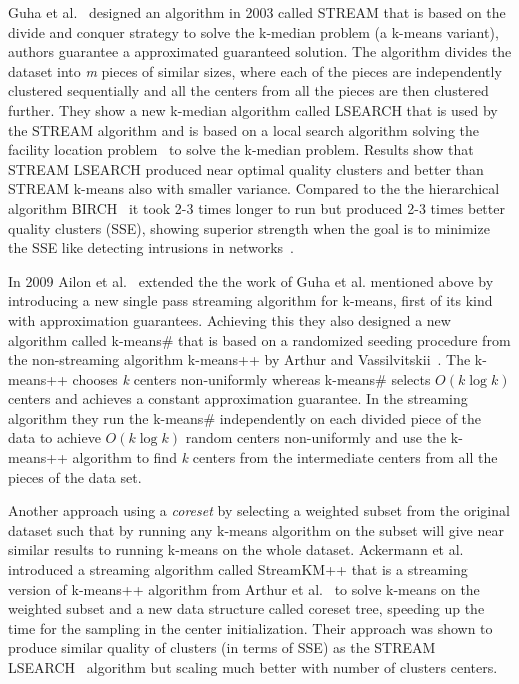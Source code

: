 Guha et al.~\citep{Guha:2003} designed an algorithm in 2003 called STREAM that is based on the divide and conquer strategy to solve the k-median problem (a k-means variant), authors guarantee a approximated guaranteed solution. The algorithm divides the dataset into \textit{m} pieces of similar sizes, where each of the pieces are independently clustered sequentially and all the centers from all the pieces are then clustered further. They show a new k-median algorithm called LSEARCH that is used by the STREAM algorithm and is based on a local search algorithm solving the facility location problem~\citep{Charikar:1999} to solve the k-median problem. Results show that STREAM LSEARCH produced near optimal quality clusters and better than STREAM k-means also with smaller variance. Compared to the the hierarchical algorithm BIRCH~\citep{Zhang:1996} it took 2-3 times longer to run but produced 2-3 times better quality clusters (SSE), showing superior strength when the goal is to minimize the SSE like detecting intrusions in networks~\citep{Marchette:1999NI}. 

In 2009 Ailon et al.~\citep{Ailon:2009} extended the the work of Guha et al. mentioned above by introducing a new single pass streaming algorithm for k-means, first of its kind with approximation guarantees. Achieving this they also designed a new algorithm called k-means\# that is based on a randomized seeding procedure from the non-streaming algorithm k-means++ by Arthur and Vassilvitskii~\citep{Arthur:2007}. The k-means++ chooses \textit{k} centers non-uniformly whereas k-means\# selects $O(k\log{k})$ centers and achieves a constant approximation guarantee. In the streaming algorithm they run the k-means\# independently on each divided piece of the data to achieve $O(k \log{k})$ random centers non-uniformly and use the k-means++ algorithm to find \textit{k} centers from the intermediate centers from all the pieces of the data set. 

Another approach using a \textit{coreset} by selecting a weighted subset from the original dataset such that by running any k-means algorithm on the subset will give near similar results to running k-means on the whole dataset. Ackermann et al.~\citep{Ackermann:2010} introduced a streaming algorithm called StreamKM++ that is a streaming version of k-means++ algorithm from Arthur et al.~\citep{Arthur:2007} to solve k-means on the weighted subset and a new data structure called coreset tree, speeding up the time for the sampling in the center initialization. Their approach was shown to produce similar quality of clusters (in terms of SSE) as the STREAM LSEARCH~\citep{Guha:2003} algorithm but scaling much better with number of clusters centers. 

